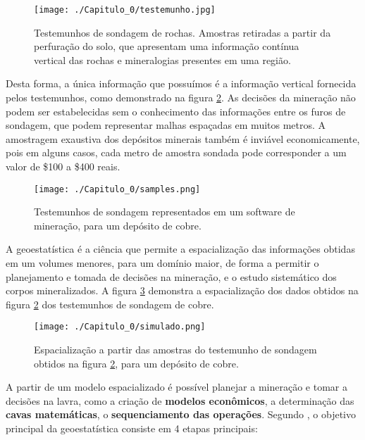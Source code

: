 \FloatBarrier
\begin{figure}[!htb]
	\centering
	\texttt{[image: ./Capitulo\_0/testemunho.jpg]}	
	\caption{Testemunhos de sondagem de rochas. Amostras retiradas a partir da perfuração do solo, que apresentam uma informação contínua vertical das rochas e mineralogias presentes em uma região. }
	\label{testemunho_de_sondagem}
\end{figure}
\FloatBarrier

Desta forma, a única informação que possuímos é a informação vertical fornecida pelos testemunhos, como demonstrado na figura \ref{testemunhos_sondagem_vertical}. As decisões da mineração não podem ser estabelecidas sem o conhecimento das informações entre os furos de sondagem, que podem representar malhas espaçadas em muitos metros. A amostragem exaustiva dos depósitos minerais também é inviável economicamente, pois em alguns casos, cada metro de amostra sondada pode corresponder a um valor de \$100 a \$400 reais. 



\FloatBarrier
\begin{figure}[!htb]
	\centering
	\texttt{[image: ./Capitulo\_0/samples.png]}	
	\caption{Testemunhos de sondagem representados em um software de mineração, para um depósito de cobre. }
	\label{testemunhos_sondagem_vertical}
\end{figure}
\FloatBarrier

A geoestatística é a ciência que permite a espacialização das informações obtidas em um volumes menores, para um domínio maior, de forma a permitir o planejamento e tomada de decisões na mineração, e o estudo sistemático dos corpos mineralizados. A figura \ref{simulado_teste} demonstra a espacialização dos dados obtidos na figura \ref{testemunhos_sondagem_vertical} dos testemunhos de sondagem de cobre.

\FloatBarrier
\begin{figure}[!htb]
	\centering
	\texttt{[image: ./Capitulo\_0/simulado.png]}	
	\caption{Espacialização a partir das amostras do testemunho de sondagem obtidos na figura \ref{testemunhos_sondagem_vertical}, para um depósito de cobre. }
	\label{simulado_teste}
\end{figure}
\FloatBarrier

 A partir de um modelo espacializado é possível planejar a mineração e tomar a decisões na lavra, como a criação de \textbf{modelos econômicos}, a determinação das \textbf{cavas matemáticas}, o \textbf{sequenciamento das operações}. Segundo \citet{rossi2013mineral}, o objetivo principal da geoestatística consiste em 4 etapas principais: 
 
